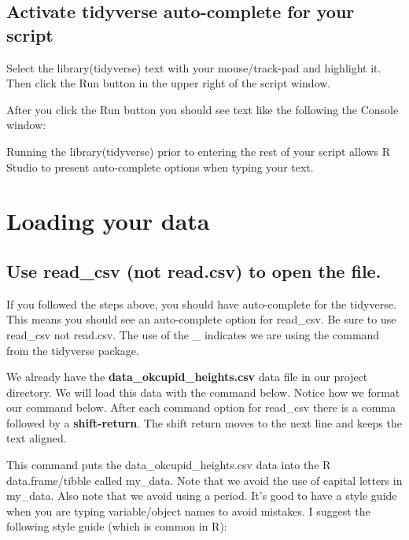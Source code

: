 \documentclass[
]{krantz}
\begin{document}
\hypertarget{activate-tidyverse-auto-complete-for-your-script}{%
\subsection{Activate tidyverse auto-complete for your script}\label{activate-tidyverse-auto-complete-for-your-script}}

Select the library(tidyverse) text with your mouse/track-pad and highlight it. Then click the Run button in the upper right of the script window.

After you click the Run button you should see text like the following the Console window:

Running the library(tidyverse) prior to entering the rest of your script allows R Studio to present auto-complete options when typing your text.

\hypertarget{loading-your-data}{%
\section{Loading your data}\label{loading-your-data}}

\hypertarget{use-read_csv-not-read.csv-to-open-the-file.}{%
\subsection{Use read\_csv (not read.csv) to open the file.}\label{use-read_csv-not-read.csv-to-open-the-file.}}

If you followed the steps above, you should have auto-complete for the tidyverse. This means you should see an auto-complete option for read\_csv. Be sure to use read\_csv not read.csv. The use of the \_ indicates we are using the command from the tidyverse package.

We already have the \textbf{data\_okcupid\_heights.csv} data file in our project directory. We will load this data with the command below. Notice how we format our command below. After each command option for read\_csv there is a comma followed by a \textbf{shift-return}. The shift return moves to the next line and keeps the text aligned.

This command puts the data\_okcupid\_heights.csv data into the R data.frame/tibble called my\_data. Note that we avoid the use of capital letters in my\_data. Also note that we avoid using a period. It's good to have a style guide when you are typing variable/object names to avoid mistakes. I suggest the following style guide (which is common in R):
\end{document}
